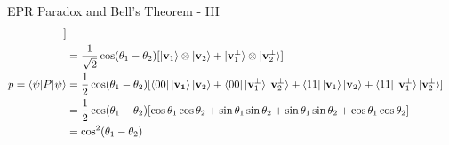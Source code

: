 \documentclass{beamer}
\begin{document}
\begin{frame}{EPR Paradox and Bell's Theorem - III\tiny{\cite{solutionofexercise420}}}
{\begin{align*}
         ] \\
      &= \frac{1}{\sqrt2} \cos (\theta_1 - \theta_2)
         [
           \ket{\mathbf{v}_1} \otimes \ket{\mathbf{v}_2}
         + \ket{\mathbf{v}_1^{\perp}} \otimes \ket{\mathbf{v}_2^{\perp}}
         ]
      \\
      p = \braket{\psi|P|\psi}
      &= \frac{1}{2} \cos (\theta_1 - \theta_2) [ \bra{00} \ket{\mathbf{v_1}} \ket{\mathbf{v}_2}
                                                + \bra{00} \ket{\mathbf{v}_1^{\perp}} \ket{\mathbf{v}_2^{\perp}}
                                                + \bra{11} \ket{\mathbf{v}_1} \ket{\mathbf{v}_2}
                                                + \bra{11} \ket{\mathbf{v}_1^{\perp}} \ket{\mathbf{v}_2^{\perp}}
                                                ] \\
      &= \frac{1}{2} \cos (\theta_1 - \theta_2) [ \cos \theta_1 \cos \theta_2
                                                + \sin \theta_1 \sin \theta_2
                                                + \sin \theta_1 \sin \theta_2
                                                + \cos \theta_1 \cos \theta_2
                                                ] \\
      &= \cos^2 (\theta_1 - \theta_2)
    \end{align*}
  }%
\end{frame}
\end{document}

